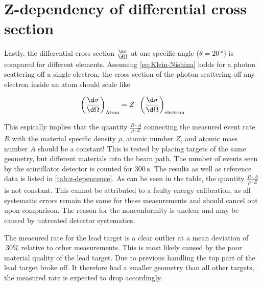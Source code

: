 
\section{Z-dependency of differential cross section}
\label{sec:z-dependence}

Lastly, the differential cross section $\frac{\d\sigma}{\d\Omega}$ at one specific
angle ($\theta = \SI{20}{\degree}$) is compared for different elements. Assuming
\autoref{eq:Klein-Nishina} holds for a photon scattering off a single electron, the 
cross section of the photon scattering off any electron inside an atom should scale
like

\begin{equation}
\label{eq:z-dependence}
\left( \frac{\d\sigma}{\d\Omega} \right)_\text{Atom} = Z\cdot\left( \frac{\d\sigma}{\d\Omega} \right)_\text{electron} 
\end{equation}

This espically implies that the quantity $\frac{R\cdot A}{\rho\cdot Z}$ connecting
the measured event rate $R$ with the material specific density $\rho$, atomic number 
$Z$, and atomic mass number $A$ should be a constant! This is tested by placing
targets of the same geometry, but different materials into the beam path. The number
of events seen by the scintillator detector is counted for $\SI{300}{\second}$. The
results as well as reference data is listed in \autoref{tab:z-depencence}. As can be
seen in the table, the quantity $\frac{R\cdot A}{\rho\cdot Z}$ is not constant. This
cannot be attributed to a faulty energy calibration, as all systematic errors remain 
the same for these measurements and should cancel out upon comparison. The reason for
the nonconformity is unclear and may be caused by untreated detector systematics.

The measured rate for the lead target is a clear outlier at a mean deviation of 
$~30\%$ relative to other measurements. This is most likely caused by the poor
material quality of the lead target. Due to previous handling the top part of the
lead target broke off. It therefore had a smaller geometry than all other targets, 
the measured rate is expected to drop accordingly.


